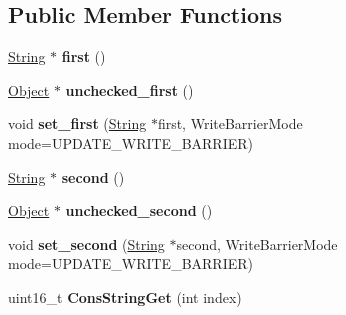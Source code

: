 \subsection*{Public Member Functions}
\begin{DoxyCompactItemize}
\item 
\hyperlink{classv8_1_1internal_1_1_string}{String} $\ast$ {\bfseries first} ()\hypertarget{classv8_1_1internal_1_1_cons_string_ab6540b105bc383ade7c48f8cc12d2339}{}\label{classv8_1_1internal_1_1_cons_string_ab6540b105bc383ade7c48f8cc12d2339}

\item 
\hyperlink{classv8_1_1internal_1_1_object}{Object} $\ast$ {\bfseries unchecked\+\_\+first} ()\hypertarget{classv8_1_1internal_1_1_cons_string_ac2ec1588574736752932d69bedf1d050}{}\label{classv8_1_1internal_1_1_cons_string_ac2ec1588574736752932d69bedf1d050}

\item 
void {\bfseries set\+\_\+first} (\hyperlink{classv8_1_1internal_1_1_string}{String} $\ast$first, Write\+Barrier\+Mode mode=U\+P\+D\+A\+T\+E\+\_\+\+W\+R\+I\+T\+E\+\_\+\+B\+A\+R\+R\+I\+ER)\hypertarget{classv8_1_1internal_1_1_cons_string_a457af0dfca59a313e41d7d630612337b}{}\label{classv8_1_1internal_1_1_cons_string_a457af0dfca59a313e41d7d630612337b}

\item 
\hyperlink{classv8_1_1internal_1_1_string}{String} $\ast$ {\bfseries second} ()\hypertarget{classv8_1_1internal_1_1_cons_string_a9d0134684950323df6720beab31f6ad4}{}\label{classv8_1_1internal_1_1_cons_string_a9d0134684950323df6720beab31f6ad4}

\item 
\hyperlink{classv8_1_1internal_1_1_object}{Object} $\ast$ {\bfseries unchecked\+\_\+second} ()\hypertarget{classv8_1_1internal_1_1_cons_string_a68c3b0092484be42ba7681d62a5ede12}{}\label{classv8_1_1internal_1_1_cons_string_a68c3b0092484be42ba7681d62a5ede12}

\item 
void {\bfseries set\+\_\+second} (\hyperlink{classv8_1_1internal_1_1_string}{String} $\ast$second, Write\+Barrier\+Mode mode=U\+P\+D\+A\+T\+E\+\_\+\+W\+R\+I\+T\+E\+\_\+\+B\+A\+R\+R\+I\+ER)\hypertarget{classv8_1_1internal_1_1_cons_string_ade98aa98d6128c06586734a67c164d41}{}\label{classv8_1_1internal_1_1_cons_string_ade98aa98d6128c06586734a67c164d41}

\item 
uint16\+\_\+t {\bfseries Cons\+String\+Get} (int index)\hypertarget{classv8_1_1internal_1_1_cons_string_a4599e754c6c77c4f814f5d53246e78b0}{}\label{classv8_1_1internal_1_1_cons_string_a4599e754c6c77c4f814f5d53246e78b0}

\end{DoxyCompactItemize}
